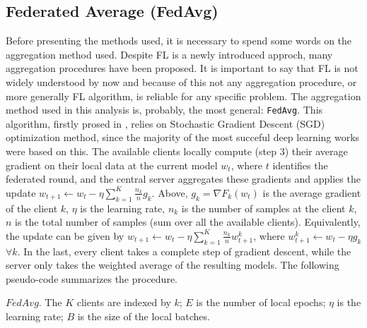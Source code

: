 \documentclass{article} %
\newcounter{math}
\begin{document}
\subsection{Federated Average (FedAvg)}
Before presenting the methods used, it is necessary to spend some words on the 
aggregation method used. Despite FL is a newly introduced approch, many 
aggregation procedures have been proposed. It is important to say that FL is 
not widely understood by now and because of this not any aggregation procedure, 
or more generally FL algorithm, is reliable for any specific problem. The 
aggregation method used in this analysis is, probably, the most general: 
\verb|FedAvg|. This algorithm, firstly prosed in \cite{mcmahan2017communicationefficient}, relies on Stochastic 
Gradient Descent (SGD) optimization method, since the majority of the most succeful deep 
learning works were based on this. The available clients locally compute (step 3) their 
average gradient on their local data at the current model $w_t$, where $t$ 
identifies the federated round, and the central server aggregates these 
gradients and applies the update $w_{t+1}\leftarrow w_t - \eta\sum_{k=1}^K\frac{n_k}{n}g_k$.
Above, $g_k=\nabla F_k(w_t)$ is the average gradient of the client $k$, $\eta$ is 
the learning rate, $n_k$ is the number of samples at the client $k$, $n$ is the total 
number of samples (sum over all the available clients). Equivalently, the update 
can be given by $w_{t+1}\leftarrow w_t - \eta\sum_{k=1}^K\frac{n_k}{n}w_{t+1}^k$, where 
$w_{t+1}^k\leftarrow w_t - \eta g_k$ $\forall k$. In the last, every client takes 
a complete step of gradient descent, while the server only takes the weighted average 
of the resulting models. The following pseudo-code summarizes the procedure.
\begin{algorithm}[H]
    \SetAlgoLined

    \caption{$FedAvg$. The $K$ clients are indexed by $k$; $E$ is the number of local 
     epochs; $\eta$ is the learning rate; $B$ is the size of the local batches.}
\end{algorithm}
\end{document}

